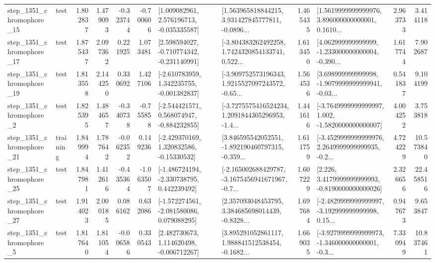 \begin{tabular}{llrrrrllrlrr}
 step\_1351\_chromophore\_15 &      test &      1.802837 &    1.479093 &     -0.323744 & -0.700606 &    [1.009082961, 2.576196713, -0.035335587] &  [1.563965818844215, 3.931427845777811, -0.0896... &       1.465435 &  [1.5619999999999976, 3.896000000000001, 0.1610... &            2.963733 &          3.414118 \\
 step\_1351\_chromophore\_17 &      test &      1.875437 &    2.097362 &      0.221925 &  1.073481 &   [2.598594027, -0.710774342, -0.231140991] &  [-3.804383262492258, 1.7424320854133741, 0.522... &       1.613450 &  [4.062999999999999, -1.233000000000004, -0.390... &            1.617744 &          7.902687 \\
 step\_1351\_chromophore\_19 &      test &      1.813558 &    2.144250 &      0.330692 &  1.427106 &   [-2.610783959, 1.342235755, -0.001382837] &  [-3.909752573196343, 1.9215527097243572, -0.65... &       1.564536 &  [3.698999999999998, -1.9079999999999941, -0.03... &            0.541837 &          9.104199 \\
  step\_1351\_chromophore\_2 &      test &      1.825395 &    1.484657 &     -0.340738 & -0.755858 &   [-2.544421571, 0.568074947, -0.884232855] &  [-3.7275575416524234, 1.2091844305296953, -1.4... &       1.441616 &  [-3.7649999999999997, 1.002, -1.5820000000000007] &            4.004252 &          3.753818 \\
 step\_1351\_chromophore\_21 &  training &      1.849994 &    1.787642 &     -0.062352 &  0.149236 &    [-2.429370169, 1.320832586, -0.15330532] &  [3.846595542052551, -1.892190460797315, -0.359... &       1.611759 &  [-3.4529999999999976, 2.2649999999999935, -0.2... &            4.724229 &         10.573840 \\
 step\_1351\_chromophore\_25 &      test &      1.847981 &    1.412616 &     -0.435364 & -1.063507 &   [-1.486724194, -2.330738795, 0.442239492] &  [-2.165002688429787, -3.1675456941671967, -0.7... &       1.607229 &   [2.226, 3.4179999999999993, -0.8190000000000026] &            2.326656 &         22.458516 \\
 step\_1351\_chromophore\_27 &      test &      1.914023 &    2.000185 &      0.086162 &  0.632086 &   [-1.572274561, -2.081580086, 0.079088295] &  [2.357093048453795, 3.384685698014439, -0.8328... &       1.697684 &  [-2.4829999999999997, -3.192999999999998, 0.15... &            0.947673 &          9.653847 \\
  step\_1351\_chromophore\_5 &      test &      1.817640 &    1.811054 &     -0.006586 &  0.330543 &    [2.482730673, 1.114620498, -0.006712267] &  [3.895291052861117, 1.988841512538454, -0.1682... &       1.669035 &  [-3.9279999999999973, -1.346000000000001, -0.3... &            7.330949 &         10.837461 \\

\end{tabular}
